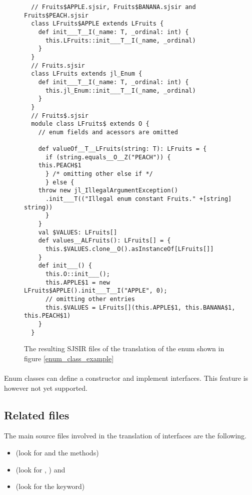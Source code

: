 \begin{figure}[H]
  \begin{verbatim}
  // Fruits$APPLE.sjsir, Fruits$BANANA.sjsir and Fruits$PEACH.sjsir
  class LFruits$APPLE extends LFruits {
    def init___T__I(_name: T, _ordinal: int) {
      this.LFruits::init___T__I(_name, _ordinal)
    }
  }
  // Fruits.sjsir
  class LFruits extends jl_Enum {
    def init___T__I(_name: T, _ordinal: int) {
      this.jl_Enum::init___T__I(_name, _ordinal)
    }
  }
  // Fruits$.sjsir
  module class LFruits$ extends O {
    // enum fields and acessors are omitted
    
    def valueOf__T__LFruits(string: T): LFruits = {
      if (string.equals__O__Z("PEACH")) {
	this.PEACH$1
      } /* omitting other else if */
      } else {
	throw new jl_IllegalArgumentException()
	  .init___T(("Illegal enum constant Fruits." +[string] string))
      }
    }
    val $VALUES: LFruits[]
    def values__ALFruits(): LFruits[] = {
      this.$VALUES.clone__O().asInstanceOf[LFruits[]]
    }
    def init___() {
      this.O::init___();
      this.APPLE$1 = new LFruits$APPLE().init___T__I("APPLE", 0);
      // omitting other entries
      this.$VALUES = LFruits[](this.APPLE$1, this.BANANA$1, this.PEACH$1)
    }
  }

  \end{verbatim}
  \caption{The resulting SJSIR files of the translation of the enum shown in figure 
\ref{enum_class_example}}
  \label{enum_class_example_ir}
\end{figure}

\paragraph{} Enum classes can define a constructor and implement interfaces. This feature is 
however not yet supported.


\subsection{Related files} The main source files involved in the translation of interfaces are 
the following.

\begin{itemize}
 \item {} (look for  and the 
 methods)
 \item {} (look for 
, ) and 
 \item {} (look for the  keyword)
\end{itemize}

